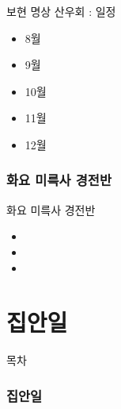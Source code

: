 \documentclass[aspectratio=1610,17pt,xcolor=pdftex,dvipsnames,table,handout]{beamer}
\begin{document}
		\begin{frame} [t,plain]
			\begin{block} {보현 명상 산우회 : 일정}
			\begin{itemize}
				\item 8월
				\item 9월
				\item 10월
				\item 11월
				\item 12월
			\end{itemize}
			\end{block}
		\end{frame}



		\section{화요 미륵사 경전반}

		\begin{frame} [t,plain]
			\begin{block} {화요 미륵사 경전반}
			\begin{itemize}
				\item 
				\item 
				\item 
			\end{itemize}
			\end{block}
		\end{frame}


		\part{집안일}
		\frame{\partpage}


		\begin{frame} [plain]{목차}
		\tableofcontents
		\end{frame}
		


		\section{집안일}
\end{document}
